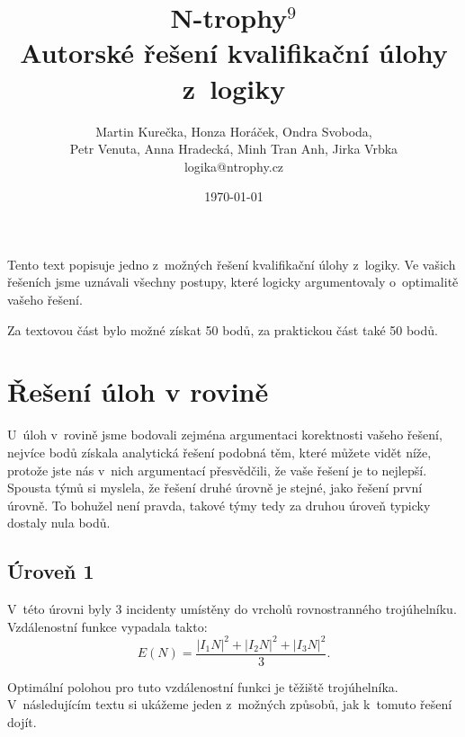 \documentclass[12pt,a4paper]{article}
\begin{document}
\pagestyle{fancy}     %
\setcounter{page}{1}  %


\title{N-trophy$^9$\\Autorské řešení kvalifikační úlohy z~logiky}
\date{\today}
\author{Martin Kurečka, Honza Horáček, Ondra Svoboda, \\ Petr Venuta, Anna Hradecká,
Minh Tran Anh, Jirka Vrbka \\
logika@ntrophy.cz}
\maketitle

\setlength{\parindent}{0cm}
\setlength{\parskip}{3mm plus2pt minus2pt}

Tento text popisuje jedno z~možných řešení kvalifikační úlohy z~logiky. Ve
vašich řešeních jsme uznávali všechny postupy, které logicky argumentovaly
o~optimalitě vašeho řešení.

Za textovou část bylo možné získat 50 bodů, za praktickou část také 50 bodů.

\section*{Řešení úloh v rovině}

U~úloh v~rovině jsme bodovali zejména argumentaci korektnosti vašeho řešení,
nejvíce bodů získala analytická řešení podobná těm, které můžete vidět níže,
protože jste nás v~nich argumentací přesvědčili, že vaše řešení je to nejlepší.
Spousta týmů si myslela, že řešení druhé úrovně je stejné, jako řešení první
úrovně. To bohužel není pravda, takové týmy tedy za druhou úroveň typicky
dostaly nula bodů.

\subsection*{Úroveň 1}

V~této úrovni byly 3 incidenty umístěny do vrcholů rovnostranného trojúhelníku.
Vzdálenostní funkce vypadala takto:
$$E(N) = \frac{|I_1N|^2 + |I_2N|^2 + |I_3N|^2}{3}.$$

Optimální polohou pro tuto vzdálenostní funkci je těžiště trojúhelníka.
V~následujícím textu si ukážeme jeden z~možných způsobů, jak k~tomuto řešení
dojít.
\end{document}
